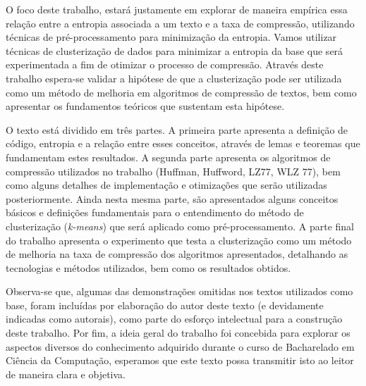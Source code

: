 O foco deste trabalho, estará justamente em explorar de maneira empírica essa relação entre a entropia associada a um texto e a taxa de compressão, utilizando técnicas de pré-processamento para minimização da entropia. 
Vamos utilizar técnicas de clusterização de dados \cite{Goog} para minimizar a entropia da base que será experimentada a fim de otimizar o processo de compressão.
Através deste trabalho espera-se validar a hipótese de que a clusterização pode ser utilizada como um método de melhoria em algoritmos de compressão de textos, bem como apresentar os fundamentos teóricos que sustentam esta hipótese.

O texto está dividido em três partes.
 A primeira parte apresenta a definição de código, entropia e a relação entre esses conceitos, através de lemas e teoremas que fundamentam estes resultados.
 A segunda parte apresenta os algoritmos de compressão utilizados no trabalho (Huffman, Huffword, LZ77, WLZ 77), bem como alguns detalhes de implementação e otimizações que serão utilizadas posteriormente.
 Ainda nesta mesma parte, são apresentados alguns conceitos básicos e definições fundamentais para o entendimento do método de clusterização (\emph{k-means}) que será aplicado como pré-processamento.
 A parte final do trabalho apresenta o experimento que testa a clusterização como um método de melhoria na taxa de compressão dos algoritmos apresentados, detalhando as tecnologias e métodos utilizados, bem como os resultados obtidos.
 
 Observa-se que, algumas das demonstrações omitidas nos textos utilizados como base, foram incluídas por elaboração do autor deste texto (e devidamente indicadas como autorais), como parte do esforço intelectual para a construção deste trabalho.
 Por fim, a ideia geral do trabalho foi concebida para explorar os aspectos diversos do conhecimento adquirido durante o curso de Bacharelado em Ciência da Computação, esperamos que este texto possa transmitir isto ao leitor de maneira clara e objetiva.
